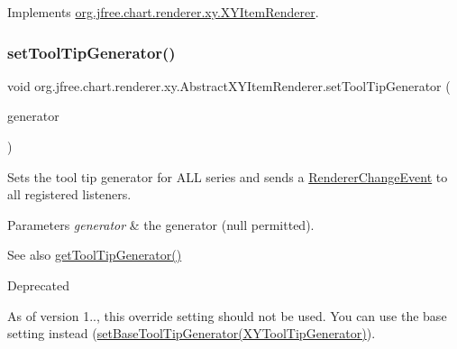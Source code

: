 Implements \mbox{\hyperlink{interfaceorg_1_1jfree_1_1chart_1_1renderer_1_1xy_1_1_x_y_item_renderer_a4198dcc9fc6534f6373dad286980d12b}{org.\+jfree.\+chart.\+renderer.\+xy.\+X\+Y\+Item\+Renderer}}.

\mbox{\label{classorg_1_1jfree_1_1chart_1_1renderer_1_1xy_1_1_abstract_x_y_item_renderer_afa8b73dbc8a04e692a889daac0a5327e}} 
\subsubsection{\texorpdfstring{set\+Tool\+Tip\+Generator()}{setToolTipGenerator()}}
{\footnotesize\ttfamily void org.\+jfree.\+chart.\+renderer.\+xy.\+Abstract\+X\+Y\+Item\+Renderer.\+set\+Tool\+Tip\+Generator (\begin{DoxyParamCaption}\item[{\mbox{\hyperlink{interfaceorg_1_1jfree_1_1chart_1_1labels_1_1_x_y_tool_tip_generator}{X\+Y\+Tool\+Tip\+Generator}}}]{generator }\end{DoxyParamCaption})}

Sets the tool tip generator for A\+LL series and sends a \mbox{\hyperlink{}{Renderer\+Change\+Event}} to all registered listeners.


\begin{DoxyParams}{Parameters}
{\em generator} & the generator ({\ttfamily null} permitted).\\
\hline
\end{DoxyParams}
\begin{DoxySeeAlso}{See also}
\mbox{\hyperlink{classorg_1_1jfree_1_1chart_1_1renderer_1_1xy_1_1_abstract_x_y_item_renderer_a1ce6222e35dd81d42ace04ab0af423e1}{get\+Tool\+Tip\+Generator()}}
\end{DoxySeeAlso}
\begin{DoxyRefDesc}{Deprecated}
\item[\mbox{\hyperlink{deprecated__deprecated000203}{Deprecated}}]As of version 1.., this override setting should not be used. You can use the base setting instead (\mbox{\hyperlink{classorg_1_1jfree_1_1chart_1_1renderer_1_1xy_1_1_abstract_x_y_item_renderer_aff6e3670d0799d590158695fe311a337}{set\+Base\+Tool\+Tip\+Generator(\+X\+Y\+Tool\+Tip\+Generator)}}). \end{DoxyRefDesc}


